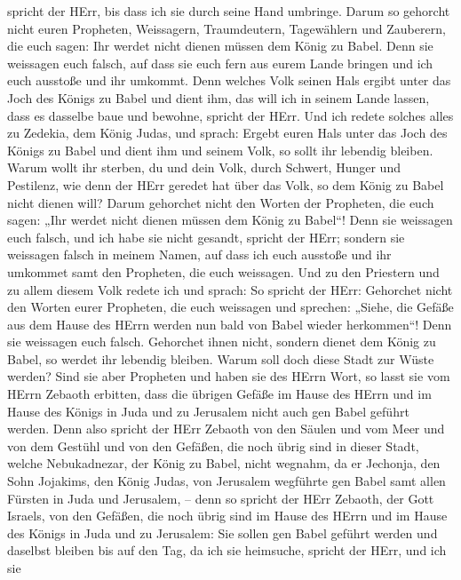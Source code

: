 spricht der HErr, bis dass ich sie durch seine Hand umbringe.
 Darum so gehorcht nicht euren Propheten, Weissagern,
Traumdeutern, Tagewählern und Zauberern, die euch sagen: Ihr werdet
nicht dienen müssen dem König zu Babel.  Denn sie weissagen
euch falsch, auf dass sie euch fern aus eurem Lande bringen und ich euch
ausstoße und ihr umkommt.  Denn welches Volk seinen Hals
ergibt unter das Joch des Königs zu Babel und dient ihm, das will ich in
seinem Lande lassen, dass es dasselbe baue und bewohne, spricht der
HErr.  Und ich redete solches alles zu Zedekia, dem König
Judas, und sprach: Ergebt euren Hals unter das Joch des Königs zu Babel
und dient ihm und seinem Volk, so sollt ihr lebendig bleiben.
 Warum wollt ihr sterben, du und dein Volk, durch Schwert,
Hunger und Pestilenz, wie denn der HErr geredet hat über das Volk, so
dem König zu Babel nicht dienen will?  Darum gehorchet
nicht den Worten der Propheten, die euch sagen: „Ihr werdet nicht dienen
müssen dem König zu Babel``! Denn sie weissagen euch falsch,
 und ich habe sie nicht gesandt, spricht der HErr; sondern
sie weissagen falsch in meinem Namen, auf dass ich euch ausstoße und ihr
umkommet samt den Propheten, die euch weissagen.  Und zu
den Priestern und zu allem diesem Volk redete ich und sprach: So spricht
der HErr: Gehorchet nicht den Worten eurer Propheten, die euch weissagen
und sprechen: „Siehe, die Gefäße aus dem Hause des HErrn werden nun bald
von Babel wieder herkommen``! Denn sie weissagen euch falsch.
 Gehorchet ihnen nicht, sondern dienet dem König zu Babel,
so werdet ihr lebendig bleiben. Warum soll doch diese Stadt zur Wüste
werden?  Sind sie aber Propheten und haben sie des HErrn
Wort, so lasst sie vom HErrn Zebaoth erbitten, dass die übrigen Gefäße
im Hause des HErrn und im Hause des Königs in Juda und zu Jerusalem
nicht auch gen Babel geführt werden.  Denn also spricht der
HErr Zebaoth von den Säulen und vom Meer und von dem Gestühl und von den
Gefäßen, die noch übrig sind in dieser Stadt,  welche
Nebukadnezar, der König zu Babel, nicht wegnahm, da er Jechonja, den
Sohn Jojakims, den König Judas, von Jerusalem wegführte gen Babel samt
allen Fürsten in Juda und Jerusalem,  -- denn so spricht
der HErr Zebaoth, der Gott Israels, von den Gefäßen, die noch übrig sind
im Hause des HErrn und im Hause des Königs in Juda und zu Jerusalem:
 Sie sollen gen Babel geführt werden und daselbst bleiben
bis auf den Tag, da ich sie heimsuche, spricht der HErr, und ich sie
